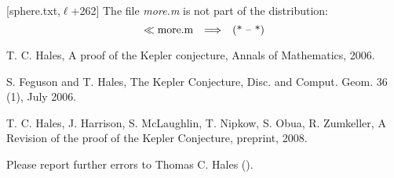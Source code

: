 \documentclass[11pt]{amsart}
\def\op#1{{\text{#1}}}
\def\to{{\quad\Longrightarrow\quad}}
\def\line{$\ell$}
\def\text{\hbox}
\begin{document}
[sphere.txt,\line+262]
The file {\it more.m} is not part of the distribution:
	$$\ll \op{more.m} \to \op{(* -- *)}$$



%


\begin{thebibliography}{}

 {T. C. Hales}, A proof of the Kepler
	conjecture, Annals of Mathematics,
	2006.
	
 {S. Feguson and T. Hales},
	The Kepler Conjecture, Disc. and Comput.
	Geom. 36 (1), July 2006.

 {T. C. Hales, J. Harrison, S. McLaughlin, T. Nipkow, S. Obua, R. Zumkeller}, A Revision of the proof of the Kepler Conjecture, preprint, 2008.


\end{thebibliography}

Please report further errors to
Thomas C. Hales ().

\bigskip
\end{document}
